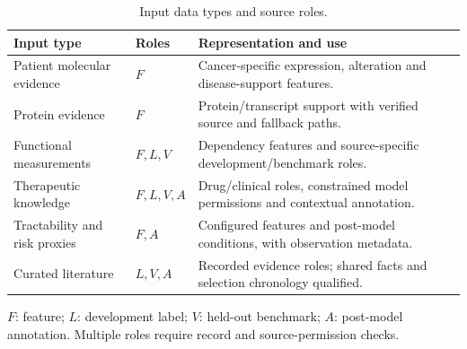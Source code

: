 \begin{table}[!tbp]
\centering\small
\caption{Input data types and source roles.}\label{tab:input-data-types}
\begin{tabularx}{\textwidth}{p{}p{}Y}\toprule
Input type & Roles & Representation and use \\ \midrule
Patient molecular evidence & $F$ & Cancer-specific expression, alteration and disease-support features. \\
Protein evidence & $F$ & Protein/transcript support with verified source and fallback paths. \\
Functional measurements & $F,L,V$ & Dependency features and source-specific development/benchmark roles. \\
Therapeutic knowledge & $F,L,V,A$ & Drug/clinical roles, constrained model permissions and contextual annotation. \\
Tractability and risk proxies & $F,A$ & Configured features and post-model conditions, with observation metadata. \\
Curated literature & $L,V,A$ & Recorded evidence roles; shared facts and selection chronology qualified. \\
\bottomrule\end{tabularx}
\parbox{\textwidth}{\footnotesize $F$: feature; $L$: development label; $V$: held-out benchmark; $A$: post-model annotation. Multiple roles require record and source-permission checks.}
\end{table}

